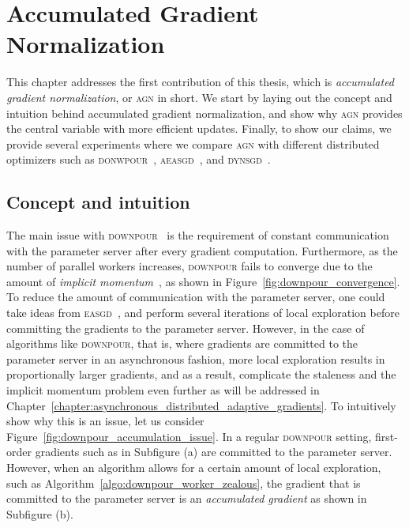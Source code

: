 %
%
%

\chapter{Accumulated Gradient Normalization}
\label{chapter:accumulated_gradient_normalization}

This chapter addresses the first contribution of this thesis, which is \emph{accumulated gradient normalization}, or \textsc{agn} in short. We start by laying out the concept and intuition behind accumulated gradient normalization, and show why \textsc{agn} provides the central variable with more efficient updates. Finally, to show our claims, we provide several experiments where we compare \textsc{agn} with different distributed optimizers such as \textsc{donwpour}~\cite{dean2012large}, \textsc{aeasgd}~\cite{zhang2015deep}, and \textsc{dynsgd}~\cite{jiang2017heterogeneity}.

\section{Concept and intuition}
\label{sec:agn_concept}

The main issue with \textsc{downpour}~\cite{dean2012large} is the requirement of constant communication with the parameter server after every gradient computation. Furthermore, as the number of parallel workers increases, \textsc{downpour} fails to converge due to the amount of \emph{implicit momentum}~\cite{implicitmomentum}, as shown in Figure~\ref{fig:downpour_convergence}. To reduce the amount of communication with the parameter server, one could take ideas from \textsc{easgd}~\cite{zhang2015deep}, and perform several iterations of local exploration before committing the gradients to the parameter server. However, in the case of algorithms like \textsc{downpour}, that is, where gradients are committed to the parameter server in an asynchronous fashion, more local exploration results in proportionally larger gradients, and as a result, complicate the staleness and the implicit momentum problem even further as will be addressed in Chapter~\ref{chapter:asynchronous_distributed_adaptive_gradients}. To intuitively show why this is an issue, let us consider Figure~\ref{fig:downpour_accumulation_issue}. In a regular \textsc{downpour} setting, first-order gradients such as in Subfigure (a) are committed to the parameter server. However, when an algorithm allows for a certain amount of local exploration, such as Algorithm~\ref{algo:downpour_worker_zealous}, the gradient that is committed to the parameter server is an \emph{accumulated gradient} as shown in Subfigure (b).

